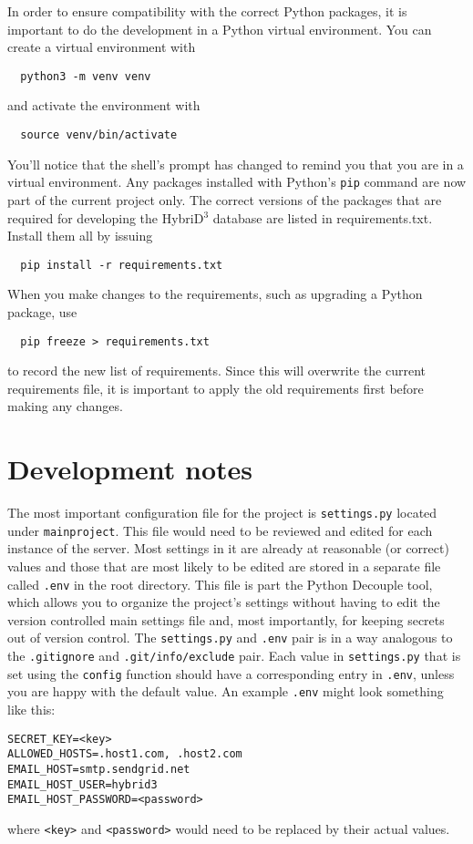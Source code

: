 \documentclass{article}
\begin{document}
In order to ensure compatibility with the correct Python packages, it is important to do the development in a Python virtual environment. You can create a virtual environment with
\begin{lstlisting}
  python3 -m venv venv
\end{lstlisting}
and activate the environment with
\begin{lstlisting}
  source venv/bin/activate
\end{lstlisting}
You'll notice that the shell's prompt has changed to remind you that you are in a virtual environment. Any packages installed with Python's \verb+pip+ command are now part of the current project only. The correct versions of the packages that are required for developing the HybriD$^3$ database are listed in requirements.txt. Install them all by issuing
\begin{lstlisting}
  pip install -r requirements.txt
\end{lstlisting}
When you make changes to the requirements, such as upgrading a Python package, use
\begin{lstlisting}
  pip freeze > requirements.txt
\end{lstlisting}
to record the new list of requirements. Since this will overwrite the current requirements file, it is important to apply the old requirements first before making any changes.

\section{Development notes}

The most important configuration file for the project is \texttt{settings.py} located under \texttt{mainproject}. This file would need to be reviewed and edited for each instance of the server. Most settings in it are already at reasonable (or correct) values and those that are most likely to be edited are stored in a separate file called \texttt{.env} in the root directory. This file is part the Python Decouple tool, which allows you to organize the project's settings without having to edit the version controlled main settings file and, most importantly, for keeping secrets out of version control. The \texttt{settings.py} and \texttt{.env} pair is in a way analogous to the \texttt{.gitignore} and \texttt{.git/info/exclude} pair. Each value in \texttt{settings.py} that is set using the \texttt{config} function should have a corresponding entry in \texttt{.env}, unless you are happy with the default value. An example \texttt{.env} might look something like this:
\begin{lstlisting}
SECRET_KEY=<key>
ALLOWED_HOSTS=.host1.com, .host2.com
EMAIL_HOST=smtp.sendgrid.net
EMAIL_HOST_USER=hybrid3
EMAIL_HOST_PASSWORD=<password>
\end{lstlisting}
where \texttt{<key>} and \texttt{<password>} would need to be replaced by their actual values.
\end{document}
